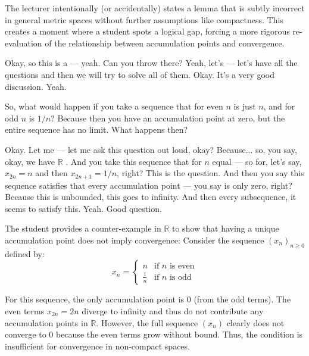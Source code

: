 \begin{didactic-insight}
The lecturer intentionally (or accidentally) states a lemma that is subtly incorrect in general metric spaces without further assumptions like compactness. This creates a  moment where a student spots a logical gap, forcing a more rigorous re-evaluation of the relationship between accumulation points and convergence.
\end{didactic-insight}

\begin{spoken-clean}[00:09:31 - 00:11:23]
Okay, so this is a — yeah. Can you throw there? Yeah, let's — let's have all the questions and then we will try to solve all of them. Okay. It's a very good discussion. Yeah. 
\end{spoken-clean}

\begin{student-interaction}
So, what would happen if you take a sequence that for even $n$ is just $n$, and for odd $n$ is $1/n$? Because then you have an accumulation point at zero, but the entire sequence has no limit. What happens then?
\end{student-interaction}

\begin{spoken-clean}[continued]
 Okay. Let me — let me ask this question out loud, okay? Because... so, you say, okay, we have $\mathbb{R}$ . And you take this sequence that for $n$ equal — so for, let's say, $x_{2n} = n$ and then $x_{2n+1} = 1/n$, right? This is the question. And then you say this sequence satisfies that every accumulation point — you say is only zero, right? Because this is unbounded, this goes to infinity. And then every subsequence, it seems to satisfy this. Yeah. Good question.
\end{spoken-clean}

\begin{math-stroke}
The student provides a counter-example in $\mathbb{R}$ to show that having a unique accumulation point does not imply convergence:
Consider the sequence $(x_n)_{n \ge 0}$ defined by:
\[
x_n = \begin{cases} 
n & \text{if } n \text{ is even} \\
\frac{1}{n} & \text{if } n \text{ is odd}
\end{cases}
\]
\begin{explanation-of-steps}
For this sequence, the only accumulation point is $0$ (from the odd terms). The even terms $x_{2n} = 2n$ diverge to infinity and thus do not contribute any accumulation points in $\mathbb{R}$. However, the full sequence $(x_n)$ clearly does not converge to $0$ because the even terms grow without bound. Thus, the condition  is insufficient for convergence in non-compact spaces.
\end{explanation-of-steps}
\end{math-stroke}

